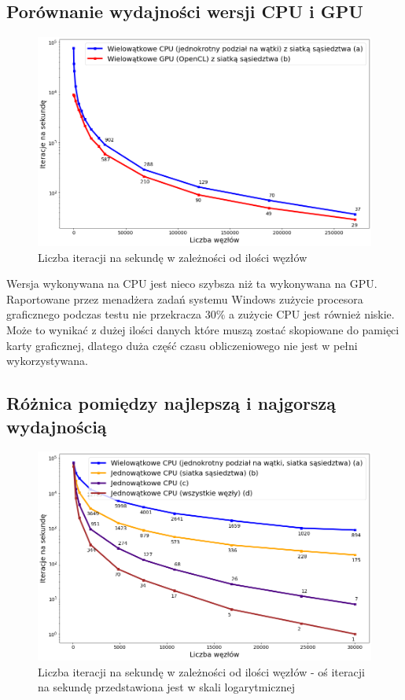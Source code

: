 \documentclass[12pt, letterpaper]{report}
\begin{document}
    \subsection{Porównanie wydajności wersji CPU i GPU}
    \begin{figure}[H]
        \centering
        \includegraphics[width=18cm]{performance_best_cpu_gpu.png}
        \caption{
            Liczba iteracji na sekundę w zależności od ilości węzłów
        }
    \end{figure}
    Wersja wykonywana na CPU jest nieco szybsza niż ta wykonywana na GPU.
    Raportowane przez menadżera zadań systemu Windows zużycie procesora graficznego podczas testu
    nie przekracza $30\%$ a zużycie CPU jest również niskie. Może to wynikać z 
    dużej ilości danych które muszą zostać skopiowane do pamięci karty graficznej, dlatego 
    duża część czasu obliczeniowego nie jest w pełni wykorzystywana.

    \subsection{Różnica pomiędzy najlepszą i najgorszą wydajnością}
    \begin{figure}[H]
        \centering
        \includegraphics[width=18cm]{performance_all_best_worst.png}
        \caption{
            Liczba iteracji na sekundę w zależności od ilości węzłów -
            oś iteracji na sekundę przedstawiona jest w skali logarytmicznej
        }
    \end{figure}
\end{document}
